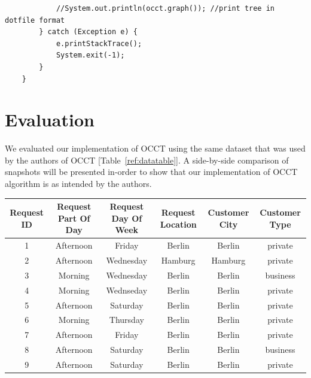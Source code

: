 \documentclass[a4paper,12pt]{article}
\begin{document}
\begin{spacing}{1.5}
\begin{lstlisting}
			//System.out.println(occt.graph()); //print tree in dotfile format
		} catch (Exception e) {
			e.printStackTrace();
			System.exit(-1);
		}
	}
\end{lstlisting}

\section{Evaluation}
We evaluated our implementation of OCCT using the same dataset that was used by the authors of OCCT [Table~\ref{ref:datatable}].
A side-by-side comparison of snapshots will be presented in-order to show that our implementation of OCCT algorithm is as intended by the authors.
\begin{table}[h]
\centering
\small
\begin{tabular}{|c|c|c|c|c|c|}\hline
  Request ID & Request Part Of Day & Request Day Of Week & Request Location & Customer City & Customer Type \\\hline
1          & Afternoon           & Friday              & Berlin           & Berlin        & private       \\\hline
2          & Afternoon           & Wednesday           & Hamburg          & Hamburg       & private       \\\hline
3          & Morning             & Wednesday           & Berlin           & Berlin        & business      \\\hline
4          & Morning             & Wednseday           & Berlin           & Berlin        & private       \\\hline
5          & Afternoon           & Saturday            & Berlin           & Berlin        & private       \\\hline
6          & Morning             & Thursday            & Berlin           & Berlin        & private       \\\hline
7          & Afternoon           & Friday              & Berlin           & Berlin        & private       \\\hline
8          & Afternoon           & Saturday            & Berlin           & Berlin        & business      \\\hline
9          & Afternoon           & Saturday            & Berlin           & Berlin        & private       \\\hline

\end{tabular}
\end{table}
\end{spacing}
\end{document}
